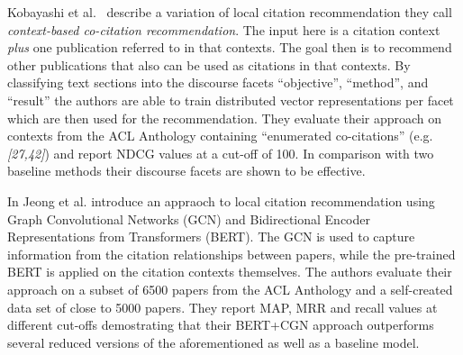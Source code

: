 Kobayashi et al.~\cite{Kobayashi2018} describe a variation of local citation recommendation they call \emph{context-based co-citation recommendation}. The input here is a citation context \emph{plus} one publication referred to in that contexts. The goal then is to recommend other publications that also can be used as citations in that contexts. By classifying text sections into the discourse facets ``objective'', ``method'', and ``result'' the authors are able to train distributed vector representations per facet which are then used for the recommendation. They evaluate their approach on contexts from the ACL Anthology containing ``enumerated co-citations'' (e.g. \emph{[27,42]}) and report NDCG values at a cut-off of 100. In comparison with two baseline methods their discourse facets are shown to be effective.

In \cite{Jeong2019} Jeong et al. introduce an appraoch to local citation recommendation using Graph Convolutional Networks (GCN) and Bidirectional Encoder Representations from Transformers (BERT). The GCN is used to capture information from the citation relationships between papers, while the pre-trained BERT is applied on the citation contexts themselves. The authors evaluate their approach on a subset of 6500 papers from the ACL Anthology and a self-created data set of close to 5000 papers. They report MAP, MRR and recall values at different cut-offs demostrating that their BERT+CGN approach outperforms several reduced versions of the aforementioned as well as a baseline model.

